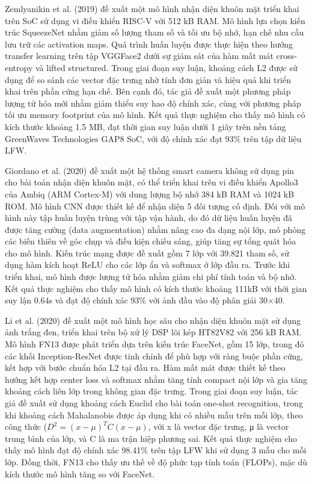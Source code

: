 Zemlyanikin et al. (2019)\cite{38_Zemlyanikin_2019_ICCV} đề xuất một mô hình nhận diện khuôn mặt triển khai trên SoC sử dụng vi điều khiển RISC-V với 512 kB RAM. Mô hình lựa chọn kiến trúc SqueezeNet nhằm giảm số lượng tham số và tối ưu bộ nhớ, hạn chế nhu cầu lưu trữ các activation maps. Quá trình huấn luyện được thực hiện theo hướng transfer learning trên tập VGGFace2 dưới sự giám sát của hàm mất mát cross-entropy và lifted structured. Trong giai đoạn suy luận, khoảng cách L2 được sử dụng để so sánh các vector đặc trưng nhờ tính đơn giản và hiệu quả khi triển khai trên phần cứng hạn chế. Bên cạnh đó, tác giả đề xuất một phương pháp lượng tử hóa mới nhằm giảm thiểu suy hao độ chính xác, cùng với phương pháp tối ưu memory footprint của mô hình. Kết quả thực nghiệm cho thấy mô hình có kích thước khoảng 1.5 MB, đạt thời gian suy luận dưới 1 giây trên nền tảng GreenWaves Technologies GAP8 SoC, với độ chính xác đạt 93\% trên tập dữ liệu LFW.

Giordano et al. (2020)\cite{32_10.1145/3417308.3430273} đề xuất một hệ thống smart camera không sử dụng pin cho bài toán nhận diện khuôn mặt, có thể triển khai trên vi điều khiển Apollo3 của Ambiq (ARM Cortex-M) với dung lượng bộ nhớ 384 kB RAM và 1024 kB ROM. Mô hình CNN được thiết kế để nhận diện 5 đối tượng cố định. Đối với mô hình này tập huấn luyện trùng với tập vận hành, do đó dữ liệu huấn luyện đã được tăng cường (data augmentation) nhằm nâng cao đa dạng nội lớp, mô phỏng các biến thiên về góc chụp và điều kiện chiếu sáng, giúp tăng sự tổng quát hóa cho mô hình. Kiến trúc mạng được đề xuất gồm 7 lớp với 39.821 tham số, sử dụng hàm kích hoạt ReLU cho các lớp ẩn và softmax ở lớp đầu ra. Trước khi triển khai, mô hình được lượng tử hóa nhằm giảm chi phí tính toán và bộ nhớ. Kết quả thực nghiệm cho thấy mô hình có kích thước khoảng 111kB với thời gian suy lận 0.64s và đạt độ chính xác 93\% với ảnh đầu vào độ phân giải 30×40.

Li et al. (2020)\cite{37_s20216114} đề xuất một mô hình học sâu cho nhận diện khuôn mặt sử dụng ảnh trắng đen, triển khai trên bộ xử lý DSP lõi kép HT82V82 với 256 kB RAM. Mô hình FN13 được phát triển dựa trên kiến trúc FaceNet, gồm 15 lớp, trong đó các khối Inception-ResNet được tinh chỉnh để phù hợp với ràng buộc phần cứng, kết hợp với bước chuẩn hóa L2 tại đầu ra. Hàm mất mát được thiết kế theo hướng kết hợp center loss và softmax nhằm tăng tính compact nội lớp và gia tăng khoảng cách liên lớp trong không gian đặc trưng. Trong giai đoạn suy luận, tác giả đề xuất sử dụng khoảng cách Euclid cho bài toán one-shot recognition, trong khi khoảng cách Mahalanobis được áp dụng khi có nhiều mẫu trên mỗi lớp, theo công thức ($D^2 = (x-\mu)^TC(x-\mu)$, với x là vector đặc trưng, μ là vector trung bình của lớp, và C là ma trận hiệp phương sai. Kết quả thực nghiệm cho thấy mô hình đạt độ chính xác 98.41\% trên tập LFW khi sử dụng 3 mẫu cho mỗi lớp. Đồng thời, FN13 cho thấy ưu thế về độ phức tạp tính toán (FLOPs), mặc dù kích thước mô hình tăng so với FaceNet.

